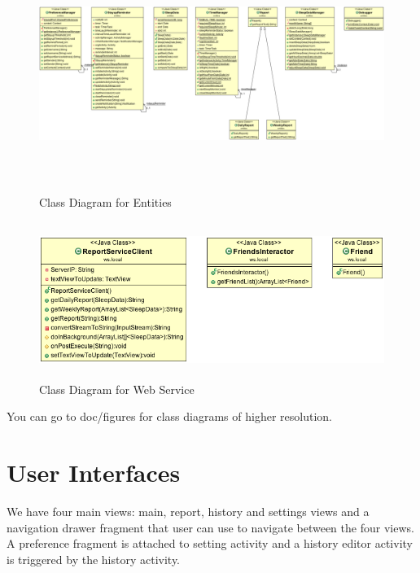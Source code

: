 \documentclass[14pt]{extreport}
\begin{document}
\begin{figure}[h]
\begin{center}
\includegraphics[width=6in,height=3in]{ClassDiagramForEntities}
\end{center}
\caption[Class Diagram for Entites]{Class Diagram for Entities}
\end{figure}

\begin{figure}[h]
\begin{center}
\includegraphics[width=5in,height=2in]{ClassDiagramForWebService}
\end{center}
\caption[Class Diagram for Web Service]{Class Diagram for Web Service}
\end{figure}

You can go to doc/figures for class diagrams of higher resolution.

\chapter{User Interfaces}
We have four main views: main, report, history and settings views and a navigation drawer fragment that user can use to navigate between the four views. A preference fragment is attached to setting activity and a history editor activity is triggered by the history activity. 
\end{document}
